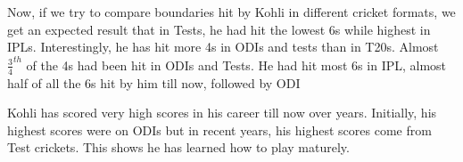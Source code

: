\documentclass[12pt]{article}
\begin{document}
\begin{figure}
    \centering
    \qquad
    \label{fig:example}
\end{figure}

\rule{0mm}{18mm}
Now, if we try to compare boundaries hit by Kohli in different cricket formats, we get an expected result that in Tests, he had hit the lowest 6s while highest in IPLs. Interestingly, he has hit more 4s in ODIs and tests than in T20s. Almost $\frac{3}{4}^{th}$ of the 4s had been hit in ODIs and Tests. He had hit most 6s in IPL, almost half of all the 6s hit by him till now, followed by ODI
\newpage


    Kohli has scored very high scores in his career till now over years. Initially, his highest scores were on ODIs but in recent years, his highest scores come from Test crickets. This shows he has learned how to play maturely.
    
\end{document}
